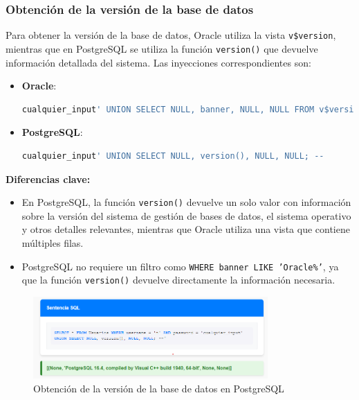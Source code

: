 \documentclass[a4paper,12pt]{article}
\begin{document}
\subsubsection{Obtención de la versión de la base de datos}
Para obtener la versión de la base de datos, Oracle utiliza la vista \texttt{v\$version}, mientras que en PostgreSQL se utiliza la función \texttt{version()} que devuelve información detallada del sistema. Las inyecciones correspondientes son:

\begin{itemize}
    \item \textbf{Oracle}:
    \begin{lstlisting}[language=SQL]
    cualquier_input' UNION SELECT NULL, banner, NULL, NULL FROM v$version WHERE banner LIKE 'Oracle%' --
    \end{lstlisting}

    \item \textbf{PostgreSQL}:
    \begin{lstlisting}[language=SQL]
    cualquier_input' UNION SELECT NULL, version(), NULL, NULL; --
    \end{lstlisting}
\end{itemize}

\textbf{Diferencias clave:}
\begin{itemize}
    \item En PostgreSQL, la función \texttt{version()} devuelve un solo valor con información sobre la versión del sistema de gestión de bases de datos, el sistema operativo y otros detalles relevantes, mientras que Oracle utiliza una vista que contiene múltiples filas.
    \item PostgreSQL no requiere un filtro como \texttt{WHERE banner LIKE 'Oracle\%'}, ya que la función \texttt{version()} devuelve directamente la información necesaria.
\end{itemize}

\begin{figure}[H]
    \centering
    \includegraphics[width=0.8\textwidth]{Imagenes/union8.png}
    \caption{Obtención de la versión de la base de datos en PostgreSQL}
\end{figure}
\end{document}
